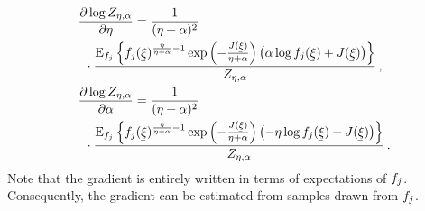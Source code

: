 \begin{align}
    &
    \frac{\partial \log Z_{\eta,\alpha}}{\partial \eta}
    =
    \frac{1}{(\eta+\alpha)^2}
    \\
    &
    \enspace\cdot
    \frac{\Eop_{\pdf_{j}} \left\{
    \pdf_{j}(\vVarCem)^{\frac{\eta}{\eta+\alpha}-1}
    \exp \left(-\frac{J(\vVarCem)}{\eta+\alpha}\right)
    \left(\alpha\log \pdf_{j}(\vVarCem)+J(\vVarCem)\right)
    \right\} }
    {
        Z_{\eta,\alpha}
    } \, ,
    \\
    &
    \frac{\partial \log Z_{\eta,\alpha}}{\partial \alpha}
    =
    \frac{1}{(\eta+\alpha)^2}
    \\
    &
    \enspace\cdot
    \frac{\Eop_{\pdf_{j}} \left\{
    \pdf_{j}(\vVarCem)^{\frac{\eta}{\eta+\alpha}-1}
    \exp \left(-\frac{J(\vVarCem)}{\eta+\alpha}\right)
    \left(-\eta\log \pdf_{j}(\vVarCem)+J(\vVarCem)\right)
    \right\} }
    {
        Z_{\eta,\alpha}
    } \, .
\end{align}
Note that the gradient is entirely written in terms of expectations of $f_j$.
Consequently, the gradient can be estimated from samples drawn from $f_j$.


